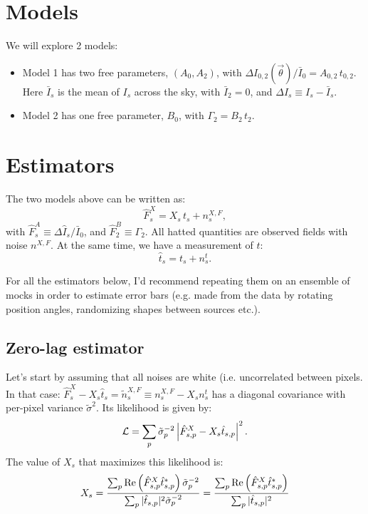 \documentclass{article}
\begin{document}
\section{Models}
  We will explore 2 models:
  \begin{itemize}
    \item Model 1 has two free parameters, $(A_0,A_2)$, with $\Delta I_{0,2}(\vec{\theta})/\bar{I}_0=A_{0,2}\,t_{0,2}$. Here $\bar{I}_s$ is the mean of $I_s$ across the sky, with $\bar{I}_2=0$, and $\Delta I_s\equiv I_s-\bar{I}_s$.
    \item Model 2 has one free parameter, $B_0$, with $\Gamma_2=B_2\,t_2$.
  \end{itemize}

\section{Estimators}
  The two models above can be written as:
  \begin{equation}
    \hat{F}^X_s=X_s\,t_s+n^{X,F}_s,
  \end{equation}
  with $\hat{F}^A_s\equiv\Delta\hat{I}_s/\bar{I}_0$, and $\hat{F}^B_2\equiv\Gamma_2$. All hatted quantities are observed fields with noise $n^{X,F}$.
  At the same time, we have a measurement of $t$:
  \begin{equation}
    \hat{t}_s=t_s+n^t_s.
  \end{equation}
  
  For all the estimators below, I'd recommend repeating them on an ensemble of mocks in order to estimate error bars (e.g. made from the data by rotating position angles, randomizing shapes between sources etc.).  
  \subsection{Zero-lag estimator}
    Let's start by assuming that all noises are white (i.e. uncorrelated between pixels. In that case: $\hat{F}^X_s-X_s\hat{t}_s=\tilde{n}^{X,F}_s\equiv n^{X,F}_s-X_sn^t_s$ has a diagonal covariance with per-pixel variance $\tilde{\sigma}^2$. Its likelihood is given by:
    \begin{equation}
      {\cal L}=\sum_p \tilde{\sigma}^{-2}_p\left|\hat{F}^X_{s,p}-X_s\hat{t}_{s,p}\right|^2.
    \end{equation}
    The value of $X_s$ that maximizes this likelihood is:
    \begin{equation}
      X_s=\frac{\sum_p {\rm Re}\left(\hat{F}^X_{s,p}\hat{t}^*_{s,p}\right)\tilde{\sigma}^{-2}_p}{\sum_p |\hat{t}_{s,p}|^2\tilde{\sigma}^{-2}_p}=\frac{\sum_p {\rm Re}\left(\hat{F}^X_{s,p}\hat{t}^*_{s,p}\right)}{\sum_p |\hat{t}_{s,p}|^2}
    \end{equation}
    
\end{document}
